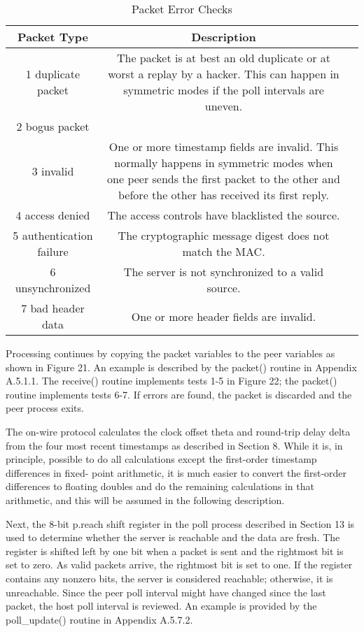 \begin{description}
    \begin{table}[htb]
    \center
    \begin{tabular}{c | c | c}
    Packet Type & Description \\
    \hline
    \hline
    1 duplicate packet & The packet is at best an old duplicate or at worst a replay by a hacker. This can happen in symmetric modes if the poll intervals are uneven. \\
    2 bogus packet & \\
    3 invalid & One or more timestamp fields are invalid. This normally happens in symmetric modes when one peer sends the first packet to the other and before the other has received its first reply. \\
    4 access denied & The access controls have blacklisted the source. \\
    5 authentication failure & The cryptographic message digest does not match the MAC. \\
    6 unsynchronized & The server is not synchronized to a valid source. \\
    7 bad header data & One or more header fields are invalid. \\
    \hline
    \end{tabular}
    \label{packet_error_checks}
    \caption{Packet Error Checks}
    \end{table}

\end{description}

Processing continues by copying the packet variables to the peer
variables as shown in Figure 21. An example is described by the
packet() routine in Appendix A.5.1.1. The receive() routine
implements tests 1-5 in Figure 22; the packet() routine implements
tests 6-7. If errors are found, the packet is discarded and the peer
process exits.

The on-wire protocol calculates the clock offset theta and round-trip
delay delta from the four most recent timestamps as described in
Section 8. While it is, in principle, possible to do all
calculations except the first-order timestamp differences in fixed-
point arithmetic, it is much easier to convert the first-order
differences to floating doubles and do the remaining calculations in
that arithmetic, and this will be assumed in the following
description.

Next, the 8-bit p.reach shift register in the poll process described
in Section 13 is used to determine whether the server is reachable
and the data are fresh. The register is shifted left by one bit when
a packet is sent and the rightmost bit is set to zero. As valid
packets arrive, the rightmost bit is set to one. If the register
contains any nonzero bits, the server is considered reachable;
otherwise, it is unreachable. Since the peer poll interval might
have changed since the last packet, the host poll interval is
reviewed. An example is provided by the poll\_update() routine in
Appendix A.5.7.2.

